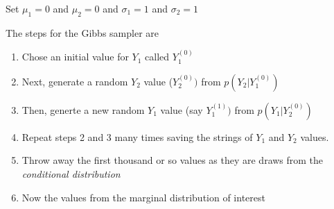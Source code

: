 \documentclass[12pt, a4paper, oneside]{article} %
\begin{document}
Set $\mu_1 = 0$ and $\mu_2 = 0$ and $\sigma_1 = 1$ and $\sigma_2 = 1$

The steps for the Gibbs sampler are 
\begin{enumerate}
\item Chose an initial value for $Y_1$ called $Y_1^{(0)}$
\item Next, generate a random $Y_2$ value ($Y_2^{(0)})$ from $p(Y_2| Y_1^{(0)})$
\item Then, generte a new random $Y_1$ value (say $Y_1^{(1)})$ from $p(Y_1| Y_2^{(0)})$
\item Repeat steps 2 and 3 many times saving the strings of $Y_1$ and $Y_2$ values.
\item Throw away the first thousand or so values as they are draws from the \emph{conditional distribution}
\item Now the values from the marginal distribution of interest
\end{enumerate}
\end{document}
